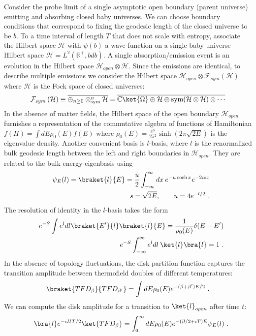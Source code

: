 \documentclass[a4paper,11pt]{article}
\theoremstyle{definition}
\numberwithin{equation}{section}
\newcommand{\mH}{\mathcal{H}}
\newcommand{\lb}{\left(}
\newcommand{\rb}{\right)}
\newcommand{\nn}{\nonumber}
\begin{document}
Consider the probe limit of a single asymptotic open boundary (parent universe) emitting and absorbing closed baby universes. We can choose boundary conditions that correspond to fixing the geodesic length of the closed universe to be $b$. To a time interval of length $T$ that does not scale with entropy, associate the Hilbert space $\mathcal{H}$ with $\psi(b)$ a wave-function on a single baby universe Hilbert space $\mathcal{H}=L^2(\mathbb{R}^+,bdb)$. A single absorption/emission event is an evolution in the Hilbert space $\mH_{open}\otimes\mathcal{H}$.
Since the emissions are identical, to describe multiple emissions we consider the Hilbert space $\mH_{open}\otimes \mathcal{F}_{sym}\lb\mathcal{H}\rb$ where $\mathcal{H}$ is the Fock space of closed universes:
\begin{eqnarray}
\mathcal{F}_{sym}\lb\mathcal{H}\rb\equiv \overline{\oplus_{n\geq 0}\otimes_\text{sym}^n\mathcal{H}}=   \overline{\mathbb{C}\ket{\Omega}\oplus \mathcal{H}\oplus \text{sym}(\mathcal{H}\otimes \mathcal{H})\otimes \cdots}
\end{eqnarray}
In the absence of matter fields, the Hilbert space of the open boundary $\mH_{open}$ furnishes a representation of the commutative algebra of functions of Hamiltonian $f(H)=\int dE \rho_0(E) f(E)$ where $\rho_0(E)=\frac{e^S}{2\pi^2}\sinh(2\pi\sqrt{2E})$ is the eigenvalue density. Another convenient basis is $l$-basis, where $l$ is the renormalized bulk geodesic length between the left and right boundaries in $\mH_{open}$. They are related to the bulk energy eigenbasis using
\begin{eqnarray}
    &&\psi_E(l)=\braket{l}{E}=\frac{u}{2}\int_{-\infty}^\infty dx\: e^{-u\cosh x}e^{-2is x}\nn\\
    &&s=\sqrt{2E},\qquad u=4e^{-l/2}\ .
\end{eqnarray}
The resolution of identity in the $l$-basis takes the form
\begin{eqnarray}
  &&e^{-S} \int e^{l}dl \braket{E'}{l}\braket{l}{E}=\frac{1}{\rho_0(E)}\delta(E-E')\\
&&    e^{-S}\int_{-\infty}^\infty e^l dl\: \ket{l}\bra{l}=1\ .
\end{eqnarray}
In the absence of topology fluctuations, the disk partition function captures the transition amplitude between thermofield doubles of different temperatures:
\begin{eqnarray}
    \braket{TFD_\beta}{TFD_{\beta'}}=\int dE \rho_0(E) e^{-(\beta+\beta')E/2}\ .
\end{eqnarray}
We can compute the disk amplitude for a transition to $\ket{l}_{open}$ after time $t$:
\begin{eqnarray}
    &&\bra{l}e^{-iHT/2}\ket{TFD_\beta}=\int_0^\infty dE \rho_0(E) e^{-(\beta/2+iT)E}\psi_E(l)\ .
\end{eqnarray}
    
\end{document}

